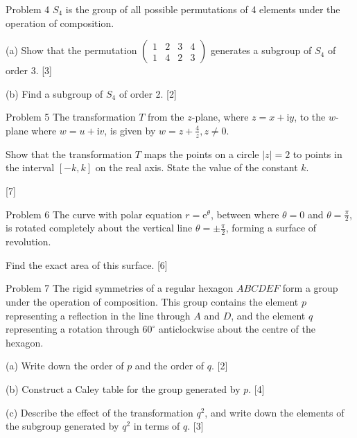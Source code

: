 \documentclass{article}
\begin{document}
\begin{problem}{Problem 4}
$S_4$ is the group of all possible permutations of 4 elements under the
operation of composition. \vspace{0.2cm}

(a) Show that the permutation
$\left(\begin{array}{llll}1 & 2 & 3 & 4 \\ 1 & 4 & 2 & 3\end{array}\right)$
generates a subgroup of $S_4$ of order 3.
[3]
\vspace{0.2cm}

(b) Find a subgroup of $S_4$ of order 2.
[2]
\end{problem}

\begin{problem}{Problem 5}
The transformation $T$ from the $z$-plane, where $z=x+\mathrm{i} y$, to the
$w$-plane where $w=u+\mathrm{i} v$, is given by $w=z+\frac{4}{z}, z \neq 0$.
\vspace{0.2cm}

Show that the transformation $T$ maps the points on a circle $|z|=2$ to
points in the interval $[-k, k]$ on the real axis. State the value of the
constant $k$.

[7]
\end{problem}

\begin{problem}{Problem 6}
The curve with polar equation $r=\mathrm{e}^\theta$, between where
$\theta=0$ and $\theta=\frac{\pi}{2}$, is rotated completely about the
vertical line $\theta= \pm \frac{\pi}{2}$, forming a surface of revolution.
\vspace{0.2cm}

Find the exact area of this surface.
[6]
\end{problem}

\begin{problem}{Problem 7}
The rigid symmetries of a regular hexagon $A B C D E F$ form a group under
the operation of composition. This group contains the element $p$
representing a reflection in the line through $A$ and $D$, and the element
$q$ representing a rotation through $60^{\circ}$ anticlockwise about the
centre of the hexagon. \vspace{0.2cm}

(a) Write down the order of $p$ and the order of $q$. [2] \vspace{0.2cm}

(b) Construct a Caley table for the group generated by $p$. [4]
\vspace{0.2cm}

(c) Describe the effect of the transformation $q^2$, and write down the
elements of the subgroup generated by $q^2$ in terms of $q$. [3]
\end{problem}
\end{document}
